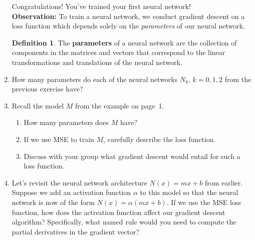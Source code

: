 \documentclass[12pt]{amsart}
\theoremstyle{definition}
\newtheorem*{definition}{Definition}
\begin{document}
\begin{enumerate}[itemsep=2.5em,leftmargin=0pt]
\noindent Congratulations! You've trained your first neural network! \\

\noindent \textbf{Observation:} To train a neural network, we conduct gradient descent on a loss function which depends solely on the \textit{parameters} of our neural network.

\begin{definition}
    The \textbf{parameters} of a neural network are the collection of components in the matrices and vectors that correspond to the linear transformations and translations of the neural network.
\end{definition}

\vspace{-2em}

\item How many parameters do each of the neural networks $N_k$, $k=0,1,2$ from the previous exercise have?


\item Recall the model $M$ from the example on page~1.
\begin{enumerate}[label=(\alph*),itemsep=.5em]
    \item How many parameters does $M$ have? 
    \item If we use MSE to train $M$, carefully describe the loss function.
    \item Discuss with your group what gradient descent would entail for such a loss function.
\end{enumerate}


\item Let's revisit the neural network architecture $N(x)=mx+b$ from earlier. Suppose we add an activation function $\alpha$ to this model so that the neural network is now of the form $N(x)=\alpha(mx+b)$. If we use the MSE loss function, how does the activation function affect our gradient descent algorithm? Specifically, what named rule would you need to compute the partial derivatives in the gradient vector?


\end{enumerate}
\end{document}
